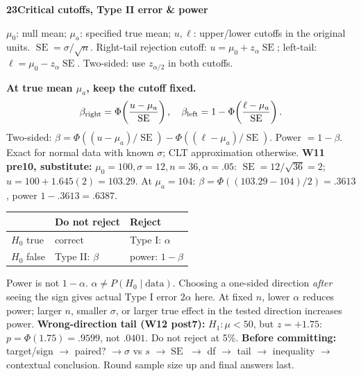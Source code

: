 \documentclass[a4paper,landscape]{article}
\newcommand{\head}[2][late]{\par\vspace{3pt}\noindent\colorbox{#1}{\parbox{\dimexpr\linewidth-6pt}{\color{white}\bfseries #2}}\par\vspace{1pt}}
\newcommand{\cue}[1]{\par\textbf{#1}\enspace}
\newcommand{\SE}{\operatorname{SE}}
\newcommand{\tblhead}[1]{\textbf{#1}}
\begin{document}
\begin{multicols*}{4}
\head{23\quad Critical cutoffs, Type II error \& power}
\(\mu_0\): null mean; \(\mu_a\): specified true mean; \(u,\ell\): upper/lower cutoffs in the original units.
\(\SE=\sigma/\sqrt n\). Right-tail rejection cutoff: \(u=\mu_0+z_\alpha\SE\); left-tail: \(\ell=\mu_0-z_\alpha\SE\). Two-sided: use \(z_{\alpha/2}\) in both cutoffs.
\cue{At true mean \(\mu_a\), keep the cutoff fixed.}
\[\beta_{\rm right}=\Phi\!\left(\frac{u-\mu_a}{\SE}\right),\quad
 \beta_{\rm left}=1-\Phi\!\left(\frac{\ell-\mu_a}{\SE}\right).\]
Two-sided: \(\beta=\Phi((u-\mu_a)/\SE)-\Phi((\ell-\mu_a)/\SE)\). Power \(=1-\beta\). Exact for normal data with known \(\sigma\); CLT approximation otherwise.
\textbf{W11 pre10, substitute:} \(\mu_0=100,\sigma=12,n=36,\alpha=.05\): \(\SE=12/\sqrt{36}=2\); \(u=100+1.645(2)=103.29\). At \(\mu_a=104\): \(\beta=\Phi((103.29-104)/2)=.3613\), power \(1-.3613=.6387\).
\begin{tabular}{@{}L{.23\linewidth}L{.33\linewidth}L{.34\linewidth}@{}}
 & \tblhead{Do not reject} & \tblhead{Reject}\\\hline
\(H_0\) true & correct & Type I: \(\alpha\)\\
\(H_0\) false & Type II: \(\beta\) & power: \(1-\beta\)
\end{tabular}
Power is not \(1-\alpha\). \(\alpha\ne P(H_0\mid\text{data})\). Choosing a one-sided direction \emph{after} seeing the sign gives actual Type I error \(2\alpha\) here. At fixed \(n\), lower \(\alpha\) reduces power; larger \(n\), smaller \(\sigma\), or larger true effect in the tested direction increases power.
\textbf{Wrong-direction tail (W12 post7):} \(H_1:\mu<50\), but \(z=+1.75\): \(p=\Phi(1.75)=.9599\), not \(.0401\). Do not reject at 5\%.
\textbf{Before committing:} target/sign \(\to\) paired? \(\to\sigma\) vs \(s\) \(\to\SE\) \(\to\) df \(\to\) tail \(\to\) inequality \(\to\) contextual conclusion. Round sample size up and final answers last.
\end{multicols*}
\end{document}
